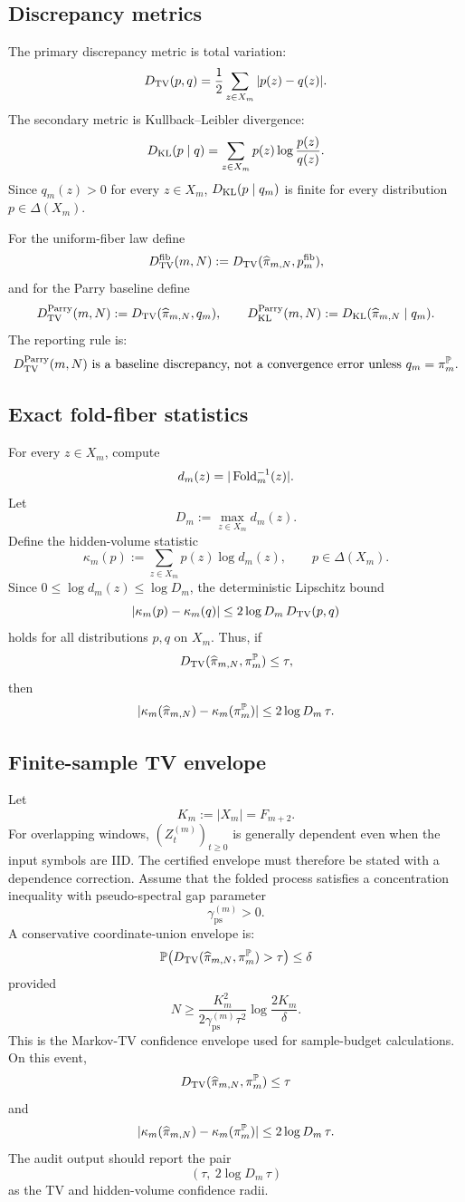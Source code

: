 \subsection{Discrepancy metrics}

The primary discrepancy metric is total variation:
\[
D_{\mathrm{TV}}(p,q)=\frac12\sum_{z\in X_m}|p(z)-q(z)|.
\]
The secondary metric is Kullback--Leibler divergence:
\[
D_{\mathrm{KL}}(p\mid q)=\sum_{z\in X_m}p(z)\log\frac{p(z)}{q(z)}.
\]
Since \(q_m(z)>0\) for every \(z\in X_m\), \(D_{\mathrm{KL}}(p\mid q_m)\) is finite for every distribution \(p\in\Delta(X_m)\).

For the uniform-fiber law define
\[
D_{\mathrm{TV}}^{\mathrm{fib}}(m,N):=D_{\mathrm{TV}}(\widehat\pi_{m,N},p_m^{\mathrm{fib}}),
\]
and for the Parry baseline define
\[
D_{\mathrm{TV}}^{\mathrm{Parry}}(m,N):=D_{\mathrm{TV}}(\widehat\pi_{m,N},q_m),
\qquad
D_{\mathrm{KL}}^{\mathrm{Parry}}(m,N):=D_{\mathrm{KL}}(\widehat\pi_{m,N}\mid q_m).
\]
The reporting rule is:
\[
D_{\mathrm{TV}}^{\mathrm{Parry}}(m,N)
\text{ is a baseline discrepancy, not a convergence error unless }
q_m=\pi_m^{\mathbb{P}}.
\]

\subsection{Exact fold-fiber statistics}

For every \(z\in X_m\), compute
\[
d_m(z)=|\operatorname{Fold}_m^{-1}(z)|.
\]
Let
\[
D_m:=\max_{z\in X_m}d_m(z).
\]
Define the hidden-volume statistic
\[
\kappa_m(p):=\sum_{z\in X_m}p(z)\log d_m(z),
\qquad p\in\Delta(X_m).
\]
Since \(0\le\log d_m(z)\le\log D_m\), the deterministic Lipschitz bound
\[
|\kappa_m(p)-\kappa_m(q)|
\le
2\log D_m\,D_{\mathrm{TV}}(p,q)
\]
holds for all distributions \(p,q\) on \(X_m\).  Thus, if
\[
D_{\mathrm{TV}}(\widehat\pi_{m,N},\pi_m^{\mathbb{P}})\le\tau,
\]
then
\[
|\kappa_m(\widehat\pi_{m,N})-\kappa_m(\pi_m^{\mathbb{P}})|
\le
2\log D_m\,\tau.
\]

\subsection{Finite-sample TV envelope}

Let
\[
K_m:=|X_m|=F_{m+2}.
\]
For overlapping windows, \((Z_t^{(m)})_{t\ge0}\) is generally dependent even when the input symbols are IID.  The certified envelope must therefore be stated with a dependence correction.  Assume that the folded process satisfies a concentration inequality with pseudo-spectral gap parameter
\[
\gamma_{\mathrm{ps}}^{(m)}>0.
\]
A conservative coordinate-union envelope is:
\[
\mathbb{P}\!\left(D_{\mathrm{TV}}(\widehat\pi_{m,N},\pi_m^{\mathbb{P}})>\tau\right)\le\delta
\]
provided
\[
\boxed{
N
\ge
\frac{K_m^2}{2\gamma_{\mathrm{ps}}^{(m)}\tau^2}
\log\frac{2K_m}{\delta}.
}
\]
This is the Markov-TV confidence envelope used for sample-budget calculations.  On this event,
\[
D_{\mathrm{TV}}(\widehat\pi_{m,N},\pi_m^{\mathbb{P}})\le\tau
\]
and
\[
|\kappa_m(\widehat\pi_{m,N})-\kappa_m(\pi_m^{\mathbb{P}})|
\le
2\log D_m\,\tau.
\]
The audit output should report the pair
\[
\left(\tau,\ 2\log D_m\,\tau\right)
\]
as the TV and hidden-volume confidence radii.

